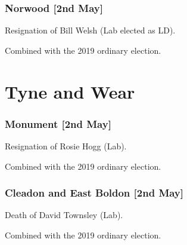 \begin{resultsiii}
	
	\subsubsection*{Norwood \hspace*{\fill}\nolinebreak[1]%
		\enspace\hspace*{\fill}
		[2nd May]}
	
	
	Resignation of Bill Welsh (Lab elected as LD).
	
	Combined with the 2019 ordinary election.
	
	\section{Tyne and Wear}
	
	
	\subsubsection*{Monument \hspace*{\fill}\nolinebreak[1]%
		\enspace\hspace*{\fill}
		[2nd May]}
	
	
	Resignation of Rosie Hogg (Lab).
	
	Combined with the 2019 ordinary election.
	
	
	\subsubsection*{Cleadon and East Boldon \hspace*{\fill}\nolinebreak[1]%
		\enspace\hspace*{\fill}
		[2nd May]}
	
	
	Death of David Townsley (Lab).
	
	Combined with the 2019 ordinary election.
	

\end{resultsiii}
